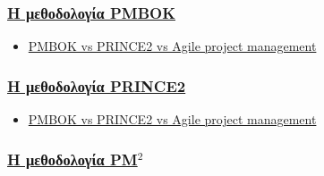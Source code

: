 \documentclass[12pt]{turabian-researchpaper}
\begin{document}
\subsubsection{\texorpdfstring{\hyperref[comparison_pmbok]{Η μεθοδολογία PMBOK}}{}}
\begin{itemize}
    \item \href{https://www2.cio.com.au/article/402347/pmbok_vs_prince2_vs_agile_project_management/}{PMBOK vs PRINCE2 vs Agile project management}
\end{itemize}

\subsubsection{\texorpdfstring{\hyperref[comparison_prince2]{Η μεθοδολογία PRINCE2}}{}}
\begin{itemize}
    \item \href{https://www2.cio.com.au/article/402347/pmbok_vs_prince2_vs_agile_project_management/}{PMBOK vs PRINCE2 vs Agile project management}
\end{itemize}

\subsubsection{\texorpdfstring{\hyperref[comparison_pm2]{Η μεθοδολογία PM\texorpdfstring{$^2$}{}}}{}}
\end{document}
